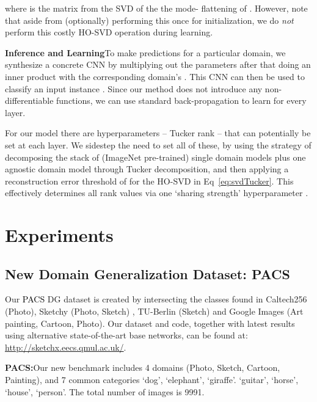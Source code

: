 \documentclass[10pt,twocolumn,letterpaper]{article}
\begin{document}
where  is the  matrix from the SVD of the the mode- flattening of . However, note that aside from (optionally) performing this once for initialization, we do \emph{not} perform this costly HO-SVD operation during learning. 

\vspace{0.1cm}\noindent\textbf{Inference and Learning}\quad To make predictions for a particular domain, we synthesize a concrete CNN by multiplying out the parameters  after that doing an inner product with the corresponding domain's . This CNN can then be used to classify an input instance . Since our method does not introduce any non-differentiable functions, we can use standard back-propagation to learn  for every layer.

For our model there are hyperparameters -- Tucker rank  -- that can potentially be set at each layer. We sidestep the need to set all of these, by using the strategy of decomposing the stack of (ImageNet pre-trained) single domain models plus one agnostic domain model through Tucker decomposition, and then applying a reconstruction error threshold of  for the HO-SVD in Eq~\ref{eq:svdTucker}. This effectively determines all rank values via one `sharing strength' hyperparameter .


\section{Experiments}
\subsection{New Domain Generalization Dataset: PACS}\label{sub:ourDataset}
Our \textcolor{black}{PACS} DG dataset is created by intersecting the classes found in Caltech256 (Photo), Sketchy (Photo, Sketch) \cite{sangkloy2016sketchy}, TU-Berlin (Sketch) \cite{eitz2012howToSketch} and Google Images (Art painting, Cartoon, Photo). Our dataset and code, together with latest results using alternative state-of-the-art base networks, can be found at: \url{http://sketchx.eecs.qmul.ac.uk/}.



\noindent\textbf{PACS:}\quad Our new benchmark includes 4 domains (Photo, Sketch, Cartoon, Painting), and 7 common categories `dog', `elephant', `giraffe'. `guitar', `horse', `house', `person'. The total number of images is 9991. 
\end{document}
